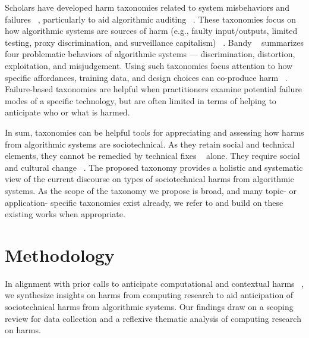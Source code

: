 Scholars have developed harm taxonomies related to system misbehaviors and failures ~\cite{Bandy2021, Shen_2021}, particularly to aid algorithmic auditing ~\cite{Raji_Kumar_Horowitz_Selbst_2022}. These taxonomies focus on how algorithmic systems are sources of harm (e.g., faulty input/outputs, limited testing, proxy discrimination, and surveillance capitalism) ~\cite{Slaughter_Kopec_Batal}. Bandy ~\cite{Bandy2021} summarizes four problematic behaviors of algorithmic systems — discrimination, distortion, exploitation, and misjudgement. Using such taxonomies focus attention to how specific affordances, training data, and design choices can co-produce harm ~\cite{barocas-hardt-narayanan, Boyarskaya_2020}. Failure-based taxonomies are helpful when practitioners examine potential failure modes of a specific technology, but are often limited in terms of helping to anticipate who or what is harmed. 

In sum, taxonomies can be helpful tools for appreciating and assessing how harms from algorithmic systems are sociotechnical. As they retain social and technical elements, they cannot be remedied by technical fixes ~\cite{Gandy_2010} alone. They require social and cultural change ~\cite{powles2018seductive}. The proposed taxonomy provides a holistic and systematic view of the current discourse on types of sociotechnical harms from algorithmic systems. As the scope of the taxonomy we propose is broad, and many topic- or application- specific taxonomies exist already, we refer to and build on these existing works when appropriate.

\section{Methodology}
\label{methods}
In alignment with prior calls to anticipate computational and contextual harms ~\cite{Boyarskaya_2020, DataSociety2022}, we synthesize insights on harms from computing research to aid anticipation of sociotechnical harms from algorithmic systems. Our findings draw on a scoping review for data collection and a reflexive thematic analysis of computing research on harms.

